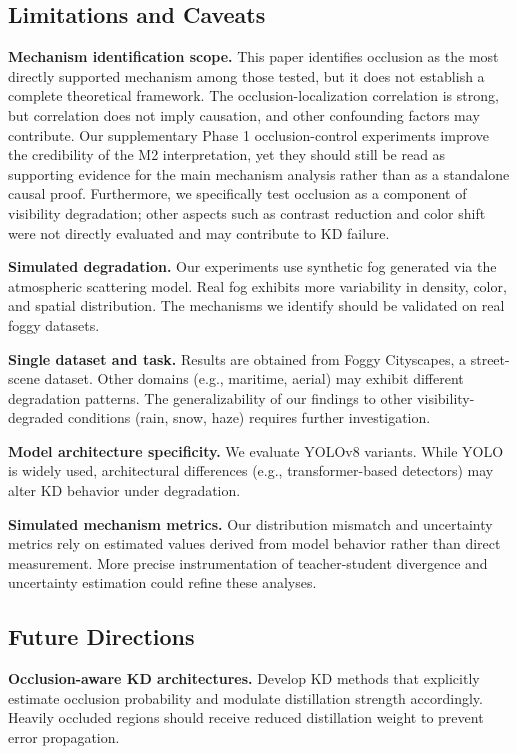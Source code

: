 \subsection{Limitations and Caveats}

\textbf{Mechanism identification scope.} This paper identifies occlusion as the most directly supported mechanism among those tested, but it does not establish a complete theoretical framework. The occlusion-localization correlation is strong, but correlation does not imply causation, and other confounding factors may contribute. Our supplementary Phase 1 occlusion-control experiments improve the credibility of the M2 interpretation, yet they should still be read as supporting evidence for the main mechanism analysis rather than as a standalone causal proof. Furthermore, we specifically test occlusion as a component of visibility degradation; other aspects such as contrast reduction and color shift were not directly evaluated and may contribute to KD failure.

\textbf{Simulated degradation.} Our experiments use synthetic fog generated via the atmospheric scattering model. Real fog exhibits more variability in density, color, and spatial distribution. The mechanisms we identify should be validated on real foggy datasets.

\textbf{Single dataset and task.} Results are obtained from Foggy Cityscapes, a street-scene dataset. Other domains (e.g., maritime, aerial) may exhibit different degradation patterns. The generalizability of our findings to other visibility-degraded conditions (rain, snow, haze) requires further investigation.

\textbf{Model architecture specificity.} We evaluate YOLOv8 variants. While YOLO is widely used, architectural differences (e.g., transformer-based detectors) may alter KD behavior under degradation.

\textbf{Simulated mechanism metrics.} Our distribution mismatch and uncertainty metrics rely on estimated values derived from model behavior rather than direct measurement. More precise instrumentation of teacher-student divergence and uncertainty estimation could refine these analyses.

\subsection{Future Directions}

\textbf{Occlusion-aware KD architectures.} Develop KD methods that explicitly estimate occlusion probability and modulate distillation strength accordingly. Heavily occluded regions should receive reduced distillation weight to prevent error propagation.


